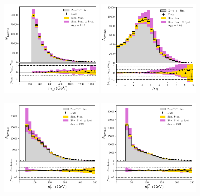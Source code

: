 \begin{figure}[h!]
    \begin{center}
        \includegraphics[width=0.45\textwidth]{figures/appendix_zee/dijet_mass_zee_PS.pdf}
        \includegraphics[width=0.45\textwidth]{figures/appendix_zee/delta_eta_zee_PS.pdf}
    \end{center}
    \begin{center}
        \includegraphics[width=0.45\textwidth]{figures/appendix_zee/lead_jet_pt_zee_PS.pdf}
        \includegraphics[width=0.45\textwidth]{figures/appendix_zee/sublead_jet_pt_zee_PS.pdf}

\end{center}
\end{figure}

